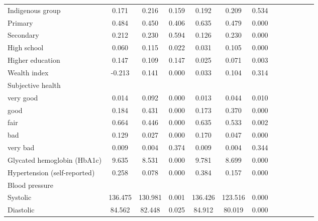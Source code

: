 \documentclass[12pt,english]{article}
\begin{document}
\begin{table}[!ht]
\begin{center}
\begin{adjustbox}{max width=\linewidth}
\begin{threeparttable}
{\begin{tabular}{l*{6}{S S}}
						Indigenous group    &       0.171&       0.216&       0.159&       0.192&       0.209&       0.534\\
						Primary             &       0.484&       0.450&       0.406&       0.635&       0.479&       0.000\\
						Secondary           &       0.212&       0.230&       0.594&       0.126&       0.230&       0.000\\
						High school         &       0.060&       0.115&       0.022&       0.031&       0.105&       0.000\\
						Higher education    &       0.147&       0.109&       0.147&       0.025&       0.071&       0.003\\
						Wealth index        &      -0.213&       0.141&       0.000&       0.033&       0.104&       0.314\\
						Subjective health       &&&&&&\\
						\hspace*{10mm}very good&       0.014&       0.092&       0.000&       0.013&       0.044&       0.010\\
						\hspace*{10mm}good     &       0.184&       0.431&       0.000&       0.173&       0.370&       0.000\\
						\hspace*{10mm}fair     &       0.664&       0.446&       0.000&       0.635&       0.533&       0.002\\
						\hspace*{10mm}bad      &       0.129&       0.027&       0.000&       0.170&       0.047&       0.000\\
						\hspace*{10mm}very bad &       0.009&       0.004&       0.374&       0.009&       0.004&       0.344\\
						Glycated hemoglobin (HbA1c)&       9.635&       8.531&       0.000&       9.781&       8.699&       0.000\\
						Hypertension (self-reported)       &   0.258&       0.078&       0.000&       0.384&       0.157&       0.000\\
						Blood pressure       &&&&&&\\
						\hspace*{10mm}Systolic             &       136.475&     130.981&       0.001&     136.426&     123.516&       0.000\\
						\hspace*{10mm}Diastolic            &       84.562&      82.448&       0.025&      84.912&      80.019&       0.000\\

\end{tabular}}
\end{threeparttable}
\end{adjustbox}
\end{center}
\end{table}
\end{document}
